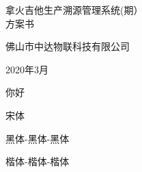 \documentclass[a4paper,12pt]{article}
\begin{document}
\begin{titlepage}
  \vspace*{0.15\textheight}
  \begin{center}
    {\Large 拿火吉他生产溯源管理系统(\uppercase\expandafter{\relax}期）\\[0.3cm]方案书} 
  \end{center}

  \vspace{0.45\textheight}
  
  \begin{center}
  {\normalsize 佛山市中达物联科技有限公司} \par
  {\normalsize 2020年3月}
  \end{center}
\end{titlepage}

\lipsum \par

你好 \par

\songti
宋体 \par

\heiti
黑体-黑体-黑体 \par

\kaiti
楷体-楷体-楷体
\end{document}
